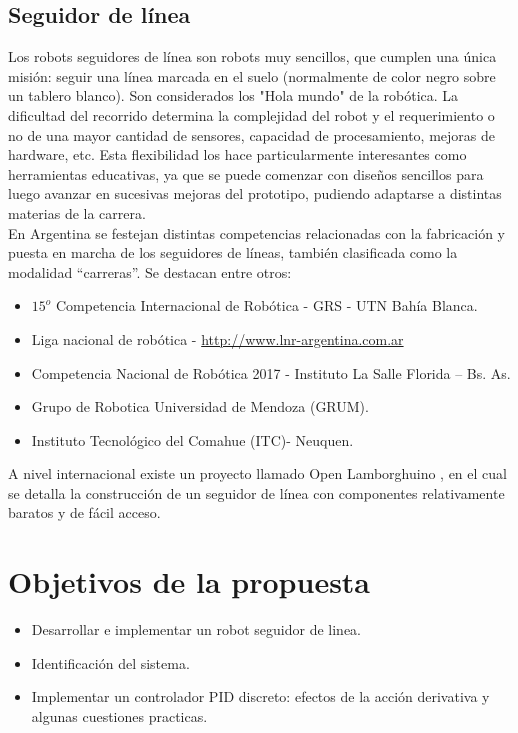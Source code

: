\documentclass[10pt,conference,a4paper,onecolumn]{article}%
\begin{document}
 \subsection{Seguidor de línea}
 Los robots seguidores de línea son robots muy sencillos, que cumplen una única misión: seguir una línea marcada en el suelo (normalmente de color negro sobre un tablero blanco). Son considerados los "Hola mundo" de la robótica. La dificultad del recorrido determina la complejidad del robot y el requerimiento o no de una mayor cantidad de sensores, capacidad de procesamiento, mejoras de hardware, etc. Esta flexibilidad los hace particularmente interesantes como herramientas educativas, ya que se puede comenzar con diseños sencillos para luego avanzar en sucesivas mejoras del prototipo, pudiendo adaptarse a distintas materias de
la carrera.\\
En Argentina se festejan distintas competencias relacionadas con la fabricación y puesta en marcha de los seguidores de líneas, también clasificada como la modalidad “carreras”. Se destacan entre otros:
\begin{itemize}
\item $15^o$ Competencia Internacional de Robótica - GRS - UTN Bahía Blanca.
\item Liga nacional de robótica - \url{http://www.lnr-argentina.com.ar}
\item Competencia Nacional de Robótica 2017 - Instituto La Salle Florida – Bs. As.
\item Grupo de Robotica Universidad de Mendoza (GRUM).
\item Instituto Tecnológico del Comahue (ITC)- Neuquen.
\end{itemize}
A nivel internacional existe un proyecto llamado Open Lamborghuino \cite{lambo}, en el cual se detalla la construcción
de un seguidor de línea con componentes relativamente baratos y de fácil acceso.

\section{Objetivos de la propuesta}
\label{objetivos}
\begin{itemize}
\item Desarrollar e implementar un robot seguidor de linea.
\item Identificación del sistema.
\item Implementar un controlador PID discreto: efectos de la acción derivativa y algunas cuestiones practicas.

\end{itemize}
\end{document}
